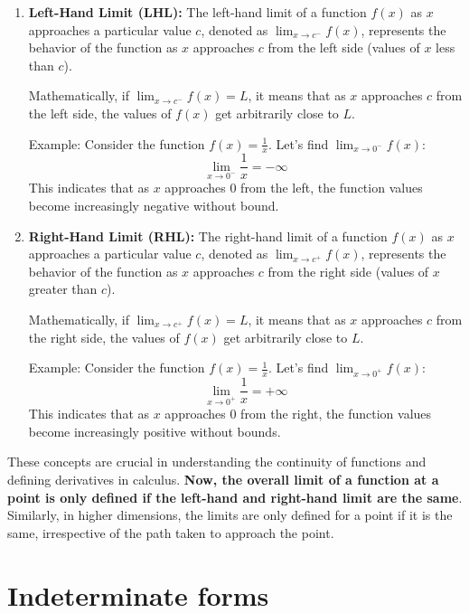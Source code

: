 \begin{enumerate}
  \item \textbf{Left-Hand Limit (LHL):}
  The left-hand limit of a function \( f(x) \) as \( x \) approaches a particular value \( c \), denoted as \( \lim_{x \to c^-} f(x) \), represents the behavior of the function as \( x \) approaches \( c \) from the left side (values of \( x \) less than \( c \)).

  Mathematically, if \( \lim_{x \to c^-} f(x) = L \), it means that as \( x \) approaches \( c \) from the left side, the values of \( f(x) \) get arbitrarily close to \( L \).

  Example:
  Consider the function \( f(x) = \frac{1}{x} \). Let's find \( \lim_{x \to 0^-} f(x) \):
  \[ \lim_{x \to 0^-} \frac{1}{x} = -\infty \]
  This indicates that as \( x \) approaches \( 0 \) from the left, the function values become increasingly negative without bound.

  \item \textbf{Right-Hand Limit (RHL):}
  The right-hand limit of a function \( f(x) \) as \( x \) approaches a particular value \( c \), denoted as \( \lim_{x \to c^+} f(x) \), represents the behavior of the function as \( x \) approaches \( c \) from the right side (values of \( x \) greater than \( c \)).

  Mathematically, if \( \lim_{x \to c^+} f(x) = L \), it means that as \( x \) approaches \( c \) from the right side, the values of \( f(x) \) get arbitrarily close to \( L \).

  Example:
  Consider the function \( f(x) = \frac{1}{x} \). Let's find \( \lim_{x \to 0^+} f(x) \):
  \[ \lim_{x \to 0^+} \frac{1}{x} = +\infty \]
  This indicates that as \( x \) approaches \( 0 \) from the right, the function values become increasingly positive without bounds. 

\end{enumerate}

These concepts are crucial in understanding the continuity of functions and defining derivatives in calculus. \textbf{Now, the overall limit of a function at a point is only defined if the left-hand and right-hand limit are the same}. Similarly, in higher dimensions, the limits are only defined for a point if it is the same, irrespective of the path taken to approach the point. 



\section{Indeterminate forms}

